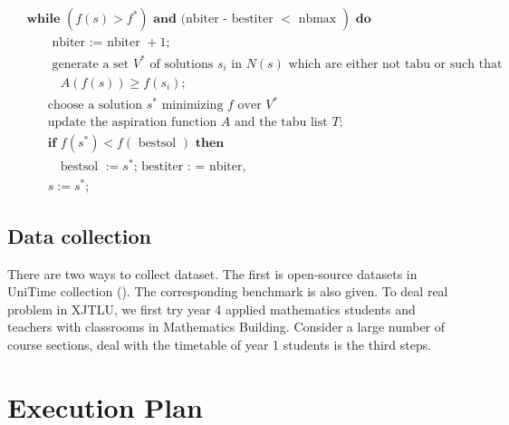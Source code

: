 \documentclass{article}
\begin{document}
\begin{align*}
	 & \textbf { while } \left.\left(f(s)>f^{*}\right) \textbf { and} \text{ (nbiter - bestiter }<\text { nbmax }\right) \textbf { do }             \\
	 & \qquad \text { nbiter := nbiter }+1 \text {; }                                                                                               \\
	 & \qquad\text { generate a set } V^{*} \text { of solutions } s_{i} \text { in } N(s) \text { which are either }\text {not tabu or such that } \\
	 & \qquad \quad A(f(s)) \geq f\left(s_{i}\right) \text {; }                                                                                     \\
	 & \qquad \text {choose a solution } s^{*} \text { minimizing } f \text { over } V^{*}                                                          \\
	 & \qquad \text {update the aspiration function } A \text { and the tabu list } T \text {; }                                                    \\
	 & \qquad \textbf {if } f\left(s^{*}\right)<f(\text { bestsol }) \textbf { then }                                                               \\
	 & \qquad \quad \text {bestsol }:=s^{*} \text {; bestiter : = nbiter, }                                                                         \\
	 & \qquad s:=s^{*} \text {; }
\end{align*}

\subsection{Data collection}

There are two ways to collect dataset. The first is open-source datasets in UniTime collection (). The corresponding benchmark is also given. To deal real problem in XJTLU, we first try year 4 applied mathematics students and teachers with classrooms in Mathematics Building. Consider a large number of course sections, deal with the timetable of year 1 students is the third steps.

\section{Execution Plan}
\label{sec: Execution Plan}
\end{document}
